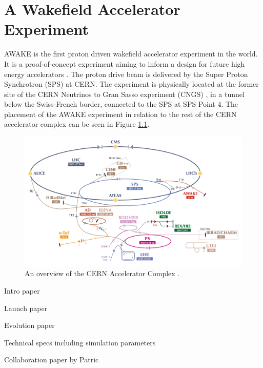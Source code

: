 %
%

\chapter{A Wakefield Accelerator Experiment}
\label{Ch:WFA}

AWAKE is the first proton driven wakefield accelerator experiment in the world. It is a proof-of-concept experiment aiming to inform a design for future high energy accelerators \cite{gschwendtner:2016}. The proton drive beam is delivered by the Super Proton Synchrotron (SPS) at CERN. The experiment is physically located at the former site of the CERN Neutrinos to Gran Sasso experiment (CNGS) \cite{gschwendtner:2010}, in a tunnel below the Swiss-French border, connected to the SPS at SPS Point 4. The placement of the AWAKE experiment in relation to the rest of the CERN accelerator complex can be seen in Figure \ref{Fig:WFA:AccComp}.

\begin{figure}[hbt]
    \centering
    \includegraphics[width=0.99\linewidth,trim={20mm 0mm 20mm 0mm},clip]{figures/AcceleratorComplex}
    \caption{\label{Fig:WFA:AccComp} An overview of the CERN Accelerator Complex \cite{add:mobs:2016}.}
\end{figure}



Intro paper \cite{caldwell:2009}

Launch paper \cite{awake_collaboration:2014}

Evolution paper \cite{caldwell:2016}

Technical specs including simulation parameters \cite{gschwendtner:2016}

Collaboration paper by Patric \cite{muggli:2018}

